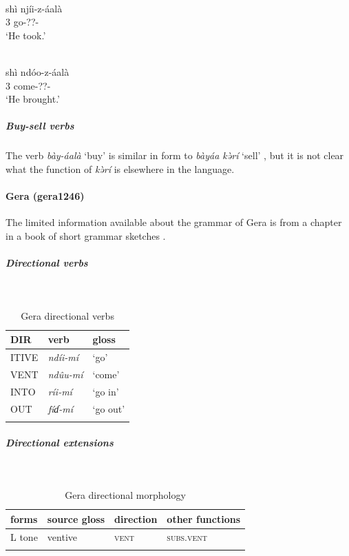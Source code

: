 \ea\label{ex2:gala1}
 \\
\gll  shì njíi-z-áalà \\
3 go-??- \\
\glt `He took.'

\ex\label{ex2:gala2}
 \\
\gll  shì ndóo-z-áalà \\
3 come-??- \\
\glt `He brought.'
\z 
\subparagraph{Buy-sell verbs}



The verb \textit{bày-áalà} `buy' is similar in form to \textit{bàyáa kə̀rí} `sell' \citep[82]{schuhBoleTangaleLanguagesBauchi1978}, but it is not clear what the function of \textit{kə̀rí} is elsewhere in the language. 

\paragraph*{Gera (gera1246)} \label{gera}

The limited information available about the grammar of Gera is from a chapter in a book of short grammar sketches \citep{schuhBoleTangaleLanguagesBauchi1978}. 

\subparagraph{Directional verbs}~



\begin{table}[H]
	\caption{Gera directional verbs} 
	\label{tab:geraV}
	\begin{tabular}{lll} %
		\lsptoprule
		DIR & verb & gloss   \\ %
		\midrule
		ITIVE & \textit{ndíi-mí} & `go' \\
		VENT & \textit{ndûu-mí} & `come' \\
		INTO& \textit{ríi-mí} & `go in' \\
		OUT & \textit{fíɗ-mí} & `go out' \\
		\lspbottomrule
	\end{tabular}
\end{table}

\subparagraph{Directional extensions}~



\begin{table}[H]
	\caption{Gera directional morphology}
	\label{tab:gera}
	\begin{tabular}{llll} %
		\lsptoprule
		forms & source gloss & direction  & other functions  \\ %
		\midrule
		L tone  &  ventive  &   \textsc{vent} &   \textsc{subs.vent}  \\
		\lspbottomrule
	\end{tabular}
\end{table} 

